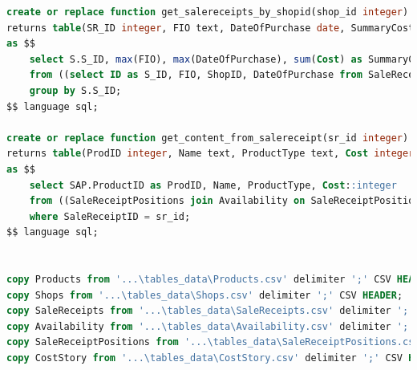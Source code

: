 \documentclass[a4paper,14pt]{extreport}
\begin{document}
\begin{lstlisting}[language=sql, caption={Сценарий создания БД}]
create or replace function get_salereceipts_by_shopid(shop_id integer)
returns table(SR_ID integer, FIO text, DateOfPurchase date, SummaryCost integer)
as $$
	select S.S_ID, max(FIO), max(DateOfPurchase), sum(Cost) as SummaryCost
	from ((select ID as S_ID, FIO, ShopID, DateOfPurchase from SaleReceipts where ShopID = shop_id) as SR join SaleReceiptPositions on SaleReceiptPositions.SaleReceiptID = SR.S_ID) as S join Costs on S.AvailabilityID = Costs.AvailabilityID
	group by S.S_ID;
$$ language sql;

create or replace function get_content_from_salereceipt(sr_id integer)
returns table(ProdID integer, Name text, ProductType text, Cost integer)
as $$
	select SAP.ProductID as ProdID, Name, ProductType, Cost::integer
	from ((SaleReceiptPositions join Availability on SaleReceiptPositions.AvailabilityID = Availability.ID) as SA join Products on Products.ID = SA.ProductID) as SAP join Costs on SAP.AvailabilityID = Costs.AvailabilityID
	where SaleReceiptID = sr_id;
$$ language sql;


copy Products from '...\tables_data\Products.csv' delimiter ';' CSV HEADER;
copy Shops from '...\tables_data\Shops.csv' delimiter ';' CSV HEADER;
copy SaleReceipts from '...\tables_data\SaleReceipts.csv' delimiter ';' CSV HEADER;
copy Availability from '...\tables_data\Availability.csv' delimiter ';' CSV HEADER;
copy SaleReceiptPositions from '...\tables_data\SaleReceiptPositions.csv' delimiter ';' CSV HEADER;
copy CostStory from '...\tables_data\CostStory.csv' delimiter ';' CSV HEADER;
\end{lstlisting}
\end{document}
